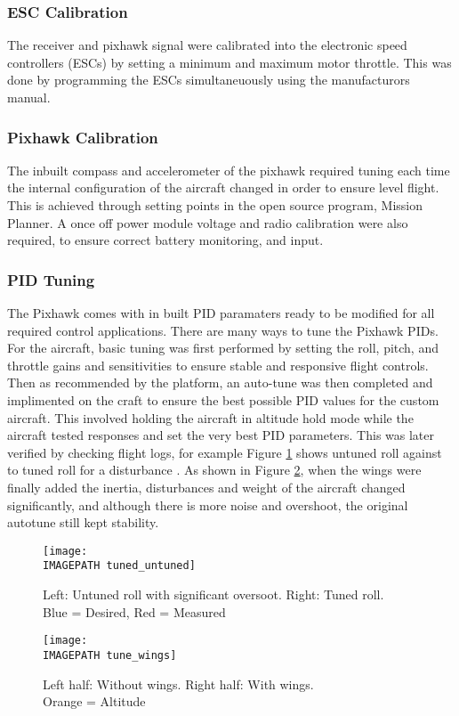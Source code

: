\subsubsection*{ESC Calibration}
The receiver and pixhawk signal were calibrated into the electronic speed controllers (ESCs) by setting a minimum and maximum motor throttle. This was done by programming the ESCs simultaneuously using the manufacturors manual.

\subsubsection*{Pixhawk Calibration}
The inbuilt compass and accelerometer of the pixhawk required tuning each time the internal configuration of the aircraft changed in order to ensure level flight. This is achieved through setting points in the open source program, Mission Planner. A once off power module voltage and radio calibration were also required, to ensure correct battery monitoring, and input. 

\subsubsection*{PID Tuning}
The Pixhawk comes with in built PID paramaters ready to be modified for all required control applications.  There are many ways to tune the Pixhawk PIDs. For the aircraft, basic tuning was first performed by setting the roll, pitch, and throttle gains and sensitivities to ensure stable and responsive flight controls. Then as recommended by the platform, an auto-tune was then completed and implimented on the craft to ensure the best possible PID values for the custom aircraft. This involved holding the aircraft in altitude hold mode while the aircraft tested responses and set the very best PID parameters. This was later verified by checking flight logs, for example Figure \ref{fig:tune1} shows untuned roll against to tuned roll for a disturbance . As shown in Figure \ref{fig:tune2}, when the wings were finally added the inertia, disturbances and weight of the aircraft changed significantly, and although there is more noise and overshoot, the original autotune still kept stability. 

\begin{figure}[!h]
	\centering
	\texttt{[image: \\IMAGEPATH tuned\_untuned]}
	\caption{Left: Untuned roll with significant oversoot. Right: Tuned roll.\\Blue = Desired, Red = Measured}
	\label{fig:tune1}
\end{figure}
\begin{figure}[!h]
	\centering
	\texttt{[image: \\IMAGEPATH tune\_wings]}
	\caption{Left half: Without wings. Right half: With wings.\\ Orange = Altitude}
	\label{fig:tune2}
\end{figure}


